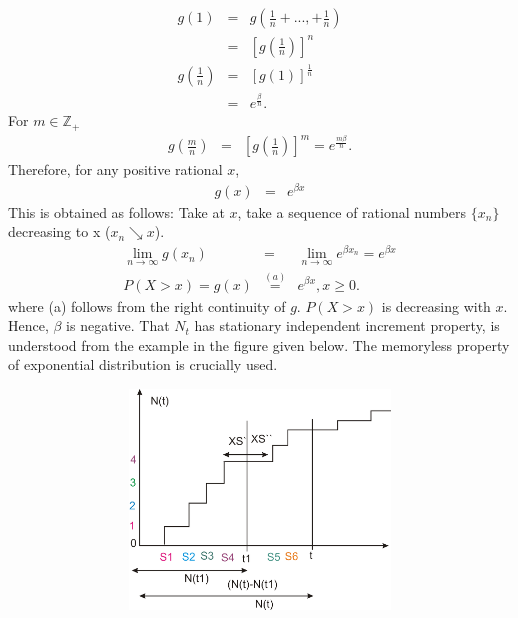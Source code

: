 \documentclass[a4paper,10pt]{article}
\theoremstyle{plain}
\theoremstyle{definition}
\begin{document}
              \begin{eqnarray*}
              g(1) &=&  g\left(\frac{1}{n}+..., +\frac{1}{n}\right) \\
             &=& \left[g\left(\frac{1}{n}\right)\right]^{n}\\
           g\left(\frac{1}{n}\right) &=&[g(1)]^{\frac{1}{n}}\\
          &=& e^{\frac{\beta}{n}}.
           \end{eqnarray*}
           For $ m \in \mathbb{Z}_{+}$
           \begin{eqnarray*}
                g\left(\frac{m}{n}\right) &=& \left[g\left(\frac{1}{n}\right)\right]^{m}= e^{\frac{m \beta}{n}}.
             \end{eqnarray*}
             Therefore, for any positive rational $x$,
              \begin{eqnarray*}
            g(x) &=& e ^{\beta x}
          \end{eqnarray*}
         This is obtained as follows:  Take at $x$, take a sequence of rational numbers $\{x_n\}$ decreasing to x ($x_{n}\searrow x$). 
           \begin{eqnarray*}
               \lim_{n\rightarrow \infty} g(x_n) &=&   \lim_{n\rightarrow \infty} e^{\beta x_{n}}= e^{\beta x}\\
         P(X>x)=g(x)&\stackrel{(a)}{=} &e^{\beta x}, x \geq 0.
\end{eqnarray*}
where (a) follows from the right continuity of $g$. $P (X>x)$  is decreasing  with $x$. Hence, $\beta $ is negative.  That ${N_{t}}$ has stationary independent increment property, is understood from the example in the figure given below. The memoryless property of exponential distribution is crucially used. 
\begin{figure}[h!t]
\center
  \includegraphics[width=5in, height=2.3in]{Figures/notes2.png}\\
\end{figure}
\end{document}
